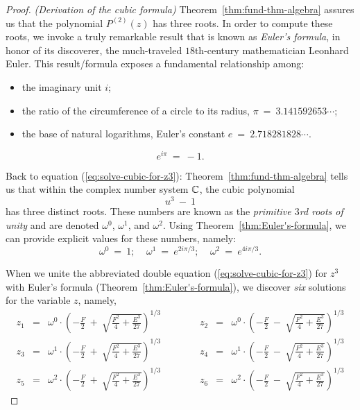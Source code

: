 \begin{proof} {\it (Derivation of the cubic formula)}
Theorem~\ref{thm:fund-thm-algebra} assures us that the polynomial
$P^{(2)}(z)$ has three roots.  In order to compute these roots, we
invoke a truly remarkable result that is known as  {\it Euler's formula}, in honor of its discoverer, the
much-traveled $18$th-century mathematician Leonhard
Euler.  This result/formula exposes a
fundamental relationship among:
\begin{itemize}
\item
the imaginary unit  $i$;
\item
the ratio of the circumference of a circle to its radius,
$\pi \ = \ 3.141592653 \cdots$;
\item
the base of natural logarithms, Euler's constant $e \ = \ 2.718281828 \cdots$.
\end{itemize}

\begin{theorem}
\label{thm:Euler's-formula}
\[ e^{i \pi} \ = \ -1. \]
\end{theorem}

Back to equation (\ref{eq:solve-cubic-for-z3}):
Theorem~\ref{thm:fund-thm-algebra} tells us that within the complex
number system $\mathbb{C}$, the cubic polynomial
\[ u^3 \ - \ 1 \]
has three distinct roots.  These numbers are known as the {\em
  primitive $3$rd roots of unity}  and are denoted $\omega^0$, $\omega^1$, and $\omega^2$.
Using Theorem~\ref{thm:Euler's-formula}, we can provide explicit
values for these numbers, namely:
\[ \omega^0 \ = \ 1; \ \ \ \ \
\omega^1 \ = \ e^{2i \pi/3}; \ \ \ \ \
\omega^2 \ = \ e^{4i \pi/3}.
\]

\medskip
When we unite the abbreviated double equation
(\ref{eq:solve-cubic-for-z3}) for $z^3$ with Euler's formula
(Theorem~\ref{thm:Euler's-formula}), we discover {\em six} solutions
for the variable $z$, namely, {\small
\begin{equation}
\label{eq:cubic-solution-1}
\begin{array}{ccrrrrrccr}
z_1 & = &
{\displaystyle
\omega^0 \cdot
\left( -\frac{F}{2} \ + \ \sqrt{\frac{F^2}{4} + \frac{E^3}{27}}
\right)^{1/3} 
}
  & & & & &
z_2 & = &
{\displaystyle
\omega^0 \cdot
\left( -\frac{F}{2} \ - \ \sqrt{\frac{F^2}{4} + \frac{E^3}{27}}
\right)^{1/3}
} \\
z_3 & = &
{\displaystyle
\omega^1 \cdot
\left( -\frac{F}{2} \ + \ \sqrt{\frac{F^2}{4} + \frac{E^3}{27}}
\right)^{1/3}
}
  & & & & & 
z_4 & = &
{\displaystyle
\omega^1 \cdot
\left( -\frac{F}{2} \ - \ \sqrt{\frac{F^2}{4} + \frac{E^3}{27}}
\right)^{1/3}
} \\
z_5 & = &
{\displaystyle
\omega^2 \cdot
\left( -\frac{F}{2} \ + \ \sqrt{\frac{F^2}{4} + \frac{E^3}{27}}
\right)^{1/3}
}
  & & & & &
z_6 & = &
{\displaystyle
\omega^2 \cdot
\left( -\frac{F}{2} \ - \ \sqrt{\frac{F^2}{4} + \frac{E^3}{27}}
\right)^{1/3}
}
\end{array}
\end{equation}
}


\end{proof}
